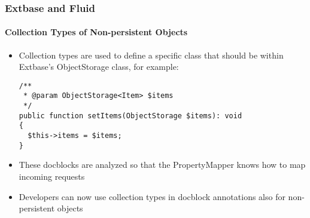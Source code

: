 %

\begin{frame}[fragile]
	\frametitle{Extbase and Fluid}
	\framesubtitle{Collection Types of Non-persistent Objects}


	\begin{itemize}
		\item Collection types are used to define a specific class that should
			be within Extbase's ObjectStorage class, for example:
\begin{lstlisting}
/**
 * @param ObjectStorage<Item> $items
 */
public function setItems(ObjectStorage $items): void
{
  $this->items = $items;
}
\end{lstlisting}

		\item These docblocks are analyzed so that the PropertyMapper knows
			how to map incoming requests
		\item Developers can now use collection types in docblock annotations
			also for non-persistent objects
	\end{itemize}

\end{frame}

